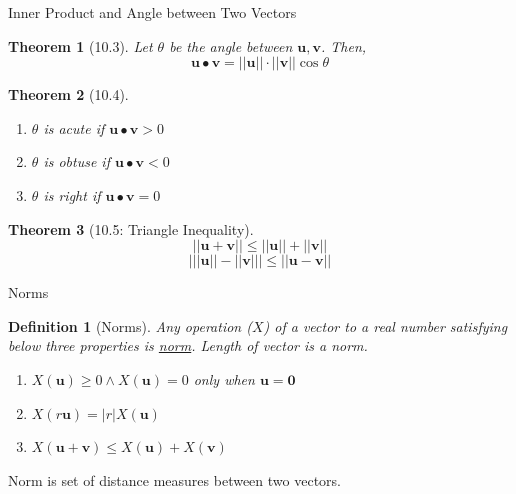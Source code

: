 \documentclass[a4paper,11pt]{article}
\newtheorem{defn}{Definition}
\newtheorem{thm}{Theorem}
\begin{document}
\begin{frame}[t]{Inner Product and Angle between Two Vectors}
	\begin{thm}
		[10.3] Let $\theta$ be the angle between $\mathbf{u,v}$. Then, \[
			\mathbf{u\bullet v} = ||\mathbf{u}||\cdot||\mathbf{v}||\cos \theta
		\]
	\end{thm}
	\begin{thm}
		[10.4] \begin{enumerate}
			\item $\theta$ is acute if $\mathbf{u\bullet v}>0$
			\item $\theta$ is obtuse if $\mathbf{u\bullet v}<0$
			\item $\theta$ is right if $\mathbf{u\bullet v}=0$
		\end{enumerate}
	\end{thm}
	\begin{thm}
		[10.5: Triangle Inequality]
		\[
			||\mathbf{u+v}||\le ||\mathbf{u}||+||\mathbf{v}||
		\]\[
			\big| ||\mathbf{u}||-||\mathbf{v}|| \big|\le ||\mathbf{u-v}||
		\]
	\end{thm}
\end{frame}

\begin{frame}[t]{Norms}
	\begin{defn}[Norms]
		Any operation ($X$) of a vector to a real number satisfying below three properties is \uline{norm}. Length of vector is a norm. 
		\begin{enumerate}
			\item $X(\mathbf{u})\ge 0 \land X(\mathbf{u})=0$ only when $\mathbf{u}=\mathbf{0}$
			\item $X(r\mathbf{u})=|r|X(\mathbf{u})$
			\item $X(\mathbf{u+v})\le X(\mathbf{u})+X(\mathbf{v})$
		\end{enumerate}
	\end{defn}
	Norm is set of distance measures between two vectors. 
\end{frame}
\end{document}
